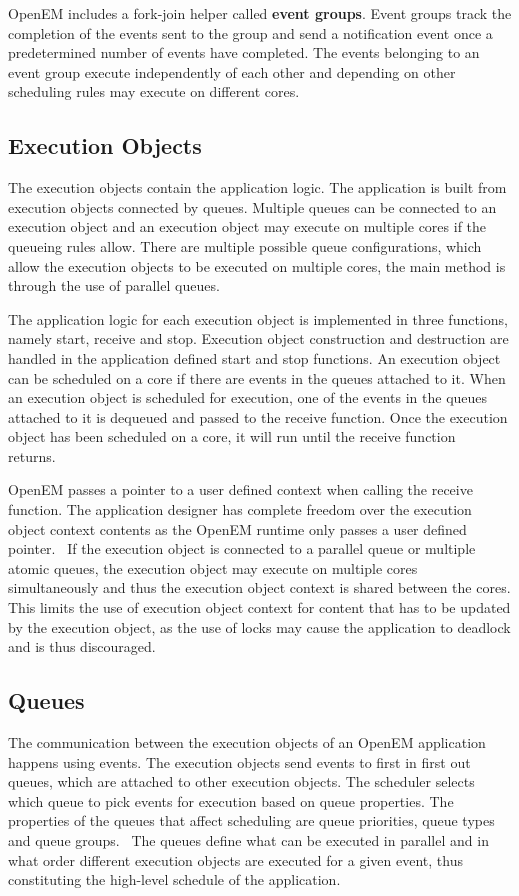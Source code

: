 OpenEM includes a fork-join helper called \textbf{event groups}. Event groups track the completion of the events sent to the group and send a notification event once a predetermined number of events have completed. The events belonging to an event group execute independently of each other and depending on other scheduling rules may execute on different cores. \cite{openemintro}

\subsection{Execution Objects}
\label{subsec:eos}
The execution objects contain the application logic. The application is built from execution objects connected by queues. Multiple queues can be connected to an execution object and an execution object may execute on multiple cores if the queueing rules allow. There are multiple possible queue configurations, which allow the execution objects to be executed on multiple cores, the main method is through the use of parallel queues.~\cite{openemintro}

The application logic for each execution object is implemented in three functions, namely start, receive and stop. Execution object construction and destruction are handled in the application defined start and stop functions. An execution object can be scheduled on a core if there are events in the queues attached to it. When an execution object is scheduled for execution, one of the events in the queues attached to it is dequeued and passed to the receive function. Once the execution object has been scheduled on a core, it will run until the receive function returns.~\cite{openemintro}

OpenEM passes a pointer to a user defined context when calling the receive function. The application designer has complete freedom over the execution object context contents as the OpenEM runtime only passes a user defined pointer.~\cite{openemintro} If the execution object is connected to a parallel queue or multiple atomic queues, the execution object may execute on multiple cores simultaneously and thus the execution object context is shared between the cores. This limits the use of execution object context for content that has to be updated by the execution object, as the use of locks may cause the application to deadlock and is thus discouraged.

\subsection{Queues}
\label{subsec:queues}
The communication between the execution objects of an OpenEM application happens using events. The execution objects send events to first in first out queues, which are attached to other execution objects. The scheduler selects which queue to pick events for execution based on queue properties. The properties of the queues that affect scheduling are queue priorities, queue types and queue groups.~\cite{openemintro} The queues define what can be executed in parallel and in what order different execution objects are executed for a given event, thus constituting the high-level schedule of the application.

